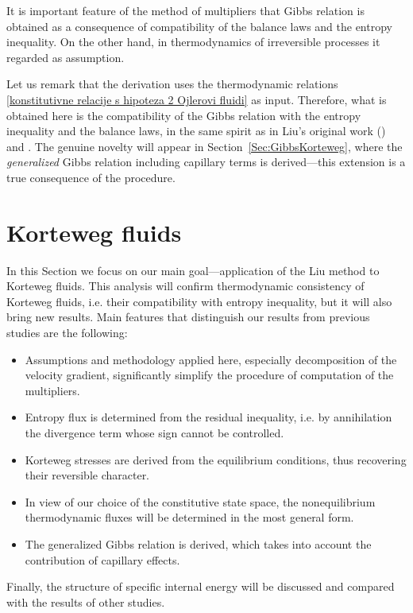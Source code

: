\documentclass[a4paper,fleqn]{cas-sc}
\theoremstyle{definition}
\begin{document}
It is important feature of the method of multipliers that Gibbs relation is obtained as a consequence of compatibility of the balance laws and the entropy inequality. On the other hand, in thermodynamics of irreversible processes it regarded as assumption.

Let us remark that the derivation uses the thermodynamic relations \eqref{konstitutivne relacije s hipoteza 2 Ojlerovi fluidi} as input. Therefore, what is obtained here is the compatibility of the Gibbs relation with the entropy inequality and the balance laws, in the same spirit as in Liu's original work (\cite{liu1972method,liu2002continuum}) and \cite{muller1985thermodynamics}. The genuine novelty will appear in Section~\ref{Sec:GibbsKorteweg}, where the \emph{generalized} Gibbs relation including capillary terms is derived---this extension is a true consequence of the procedure.


\section{Korteweg fluids} \label{Sec:KortewegFluids}


In this Section we focus on our main goal---application of the Liu method to Korteweg fluids. This analysis will confirm thermodynamic consistency of Korteweg fluids, i.e. their compatibility with entropy inequality, but it will also bring new results. Main features that distinguish our results from previous studies are the following: 
\begin{itemize}
	\item[(a)] Assumptions and methodology applied here, especially decomposition of the velocity gradient, significantly simplify the procedure of computation of the multipliers. 
	\item[(b)] Entropy flux is determined from the residual inequality, i.e. by annihilation the divergence term whose sign cannot be controlled. 
	\item[(c)] Korteweg stresses are derived from the equilibrium conditions, thus recovering their reversible character. 
	\item[(d)] In view of our choice of the constitutive state space, the nonequilibrium thermodynamic fluxes will be determined in the most general form. 
	\item[(e)] The generalized Gibbs relation is derived, which takes into account the contribution of capillary effects.
\end{itemize}
Finally, the structure of specific internal energy will be discussed and compared with the results of other studies. 
\end{document}
